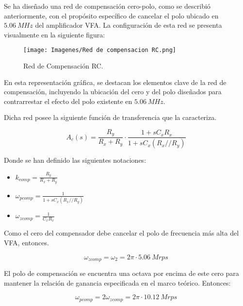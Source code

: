\documentclass[12pt,A4paper,titlepage]{article}
\begin{document}
\hspace{1mm} Se ha diseñado una red de compensación cero-polo, como se describió anteriormente, con el propósito específico de cancelar el polo ubicado en \(5.06~MHz\) del amplificador VFA. La configuración de esta red se presenta visualmente en la siguiente figura:

\begin{figure}[!h]
    \centering
    \texttt{[image: Imagenes/Red de compensacion RC.png]}
    \caption{Red de Compensación RC.}
\end{figure}

\hspace{1mm} En esta representación gráfica, se destacan los elementos clave de la red de compensación, incluyendo la ubicación del cero y del polo diseñados para contrarrestar el efecto del polo existente en \(5.06~MHz\).

\bigskip
\hspace{1mm} Dicha red posee la siguiente función de transferencia que la caracteriza.

\begin{equation}
    A_c(s) = \frac{R_y}{R_x + R_y} \cdot \frac{1 + sC_x R_x}{1 + sC_x (R_x // R_y)}
\end{equation}

\hspace{1mm} Donde se han definido las siguientes notaciones:

\begin{itemize}[itemsep=1pt]
    \item \(k_{comp}=\frac{R_y}{R_x + R_y}\)
    \item \( \omega_{pcomp} =  \frac{1 }{1 + sC_x (R_x // R_y)}\)
    \item \(\omega_{zcomp} = \frac{1 }{ C_xR_x}\)
\end{itemize}

\hspace{1mm} Como el cero del compensador debe cancelar el polo de frecuencia más alta del VFA, entonces.

\begin{equation}
    \omega_{zcomp} = \omega_2 = 2\pi \cdot 5.06~Mrps
\end{equation}

\hspace{1mm} El polo de compensación se encuentra una octava por encima de este cero para mantener la relación de ganancia especificada en el marco teórico. Entonces:

\begin{equation}
    \omega _{pcomp} = 2\omega _{zcomp} = 2\pi \cdot 10.12~Mrps
\end{equation}
\end{document}

